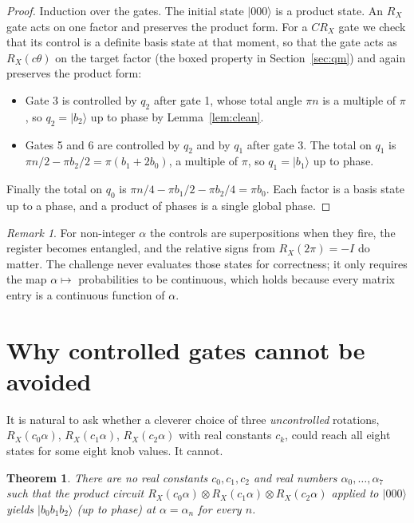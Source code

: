 \documentclass[11pt,a4paper]{article}
\newcommand{\ket}[1]{\lvert #1 \rangle}
\newcommand{\RX}{R_X}
\newcommand{\CRX}{CR_X}
\theoremstyle{plain}
\newtheorem{theorem}[lemma]{Theorem}
\theoremstyle{definition}
\theoremstyle{remark}
\newtheorem{remark}[lemma]{Remark}
\begin{document}
\begin{proof}
Induction over the gates. The initial state $\ket{000}$ is a product state. An $\RX$ gate acts on
one factor and preserves the product form. For a $\CRX$ gate we check that its control is a
definite basis state at that moment, so that the gate acts as $\RX(c\theta)$ on the target factor
(the boxed property in Section~\ref{sec:qm}) and again preserves the product form:
\begin{itemize}[nosep]
\item Gate 3 is controlled by $q_2$ after gate 1, whose total angle $\pi n$ is a multiple of
      $\pi$, so $q_2 = \ket{b_2}$ up to phase by Lemma~\ref{lem:clean}.
\item Gates 5 and 6 are controlled by $q_2$ and by $q_1$ after gate 3. The total on $q_1$ is
      $\pi n/2 - \pi b_2/2 = \pi(b_1+2b_0)$, a multiple of $\pi$, so $q_1 = \ket{b_1}$ up to
      phase.
\end{itemize}
Finally the total on $q_0$ is $\pi n/4 - \pi b_1/2 - \pi b_2/4 = \pi b_0$. Each factor is a basis
state up to a phase, and a product of phases is a single global phase.
\end{proof}

\begin{remark}
For non-integer $\alpha$ the controls are superpositions when they fire, the register becomes
entangled, and the relative signs from $\RX(2\pi)=-I$ do matter. The challenge never evaluates
those states for correctness; it only requires the map $\alpha\mapsto$ probabilities to be
continuous, which holds because every matrix entry is a continuous function of $\alpha$.
\end{remark}

\section{Why controlled gates cannot be avoided}\label{sec:impossible}

It is natural to ask whether a cleverer choice of three \emph{uncontrolled} rotations,
$\RX(c_0\alpha)$, $\RX(c_1\alpha)$, $\RX(c_2\alpha)$ with real constants $c_k$, could reach all
eight states for some eight knob values. It cannot.

\begin{theorem}\label{thm:impossible}
There are no real constants $c_0,c_1,c_2$ and real numbers $\alpha_0,\dots,\alpha_7$ such that
the product circuit $\RX(c_0\alpha)\otimes\RX(c_1\alpha)\otimes\RX(c_2\alpha)$ applied to
$\ket{000}$ yields $\ket{b_0b_1b_2}$ (up to phase) at $\alpha = \alpha_n$ for every $n$.
\end{theorem}
\end{document}
